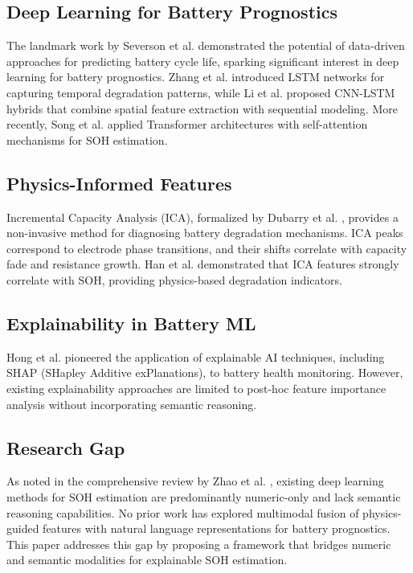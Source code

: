 \documentclass[conference]{IEEEtran}
\begin{document}
\subsection{Deep Learning for Battery Prognostics}

The landmark work by Severson et al. \cite{severson2019} demonstrated the potential of data-driven approaches for predicting battery cycle life, sparking significant interest in deep learning for battery prognostics. Zhang et al. \cite{zhang2018} introduced LSTM networks for capturing temporal degradation patterns, while Li et al. \cite{li2019} proposed CNN-LSTM hybrids that combine spatial feature extraction with sequential modeling. More recently, Song et al. \cite{song2022} applied Transformer architectures with self-attention mechanisms for SOH estimation.

\subsection{Physics-Informed Features}

Incremental Capacity Analysis (ICA), formalized by Dubarry et al. \cite{dubarry2012}, provides a non-invasive method for diagnosing battery degradation mechanisms. ICA peaks correspond to electrode phase transitions, and their shifts correlate with capacity fade and resistance growth. Han et al. \cite{han2014} demonstrated that ICA features strongly correlate with SOH, providing physics-based degradation indicators.

\subsection{Explainability in Battery ML}

Hong et al. \cite{hong2020} pioneered the application of explainable AI techniques, including SHAP (SHapley Additive exPlanations), to battery health monitoring. However, existing explainability approaches are limited to post-hoc feature importance analysis without incorporating semantic reasoning.

\subsection{Research Gap}

As noted in the comprehensive review by Zhao et al. \cite{zhao2021}, existing deep learning methods for SOH estimation are predominantly numeric-only and lack semantic reasoning capabilities. No prior work has explored multimodal fusion of physics-guided features with natural language representations for battery prognostics. This paper addresses this gap by proposing a framework that bridges numeric and semantic modalities for explainable SOH estimation.
\end{document}
